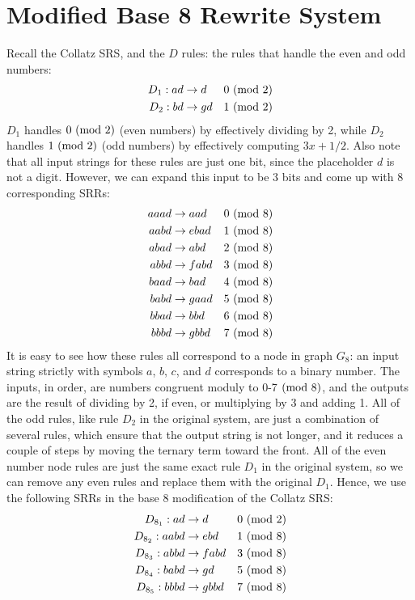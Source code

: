 \section{Modified Base 8 Rewrite System} \label{subsec:base8rewrite}
Recall the Collatz SRS, and the $D$ rules: the rules that handle the even and odd numbers:
\begin{align*}
    D_1: ad &\rightarrow d &\text{$0\ (\mathrm{mod}\ 2)$}\\
    D_2: bd &\rightarrow gd &\text{$1\ (\mathrm{mod}\ 2)$}\\
\end{align*}
$D_1$ handles $0 \ (\mathrm{mod}\ 2)$ (even numbers) by effectively dividing by 2, while $D_2$ handles $1 \ (\mathrm{mod}\ 2)$ (odd numbers)  by effectively computing $3x+1/2$. Also note that all input strings for these rules are just one bit, since the placeholder $d$ is not a digit. However, we can expand this input to be 3 bits and come up with 8 corresponding SRRs:
\begin{align*}
    aaad &\rightarrow aad &\text{$0\ (\mathrm{mod}\ 8)$}\\
    aabd &\rightarrow ebad &\text{$1\ (\mathrm{mod}\ 8)$}\\
    abad &\rightarrow abd &\text{$2\ (\mathrm{mod}\ 8)$}\\
    abbd &\rightarrow fabd &\text{$3\ (\mathrm{mod}\ 8)$}\\
    baad &\rightarrow bad &\text{$4\ (\mathrm{mod}\ 8)$}\\
    babd &\rightarrow gaad &\text{$5\ (\mathrm{mod}\ 8)$}\\
    bbad &\rightarrow bbd &\text{$6\ (\mathrm{mod}\ 8)$}\\
    bbbd &\rightarrow gbbd &\text{$7\ (\mathrm{mod}\ 8)$}
\end{align*}
It is easy to see how these rules all correspond to a node in graph $G_8$: an input string strictly with symbols $a$, $b$, $c$, and $d$ corresponds to a binary number. The inputs, in order, are numbers congruent moduly to 0-7$\ (\mathrm{mod}\ 8)$, and the outputs are the result of dividing by 2, if even, or multiplying by 3 and adding 1. All of the odd rules, like rule $D_2$ in the original system, are just a combination of several rules, which ensure that the output string is not longer, and it reduces a couple of steps by moving the ternary term toward the front. All of the even number node rules are just the same exact rule $D_1$ in the original system, so we can remove any even rules and replace them with the original $D_1$. Hence, we use the following SRRs in the base 8 modification of the Collatz SRS:
\begin{align*}
    D_{8_1}: ad &\rightarrow d &\text{$0\ (\mathrm{mod}\ 2)$}\\
    D_{8_2}: aabd &\rightarrow ebd &\text{$1\ (\mathrm{mod}\ 8)$}\\
    D_{8_3}: abbd &\rightarrow fabd &\text{$3\ (\mathrm{mod}\ 8)$}\\
    D_{8_4}: babd &\rightarrow gd &\text{$5\ (\mathrm{mod}\ 8)$}\\
    D_{8_5}: bbbd &\rightarrow gbbd &\text{$7\ (\mathrm{mod}\ 8)$}
\end{align*}
